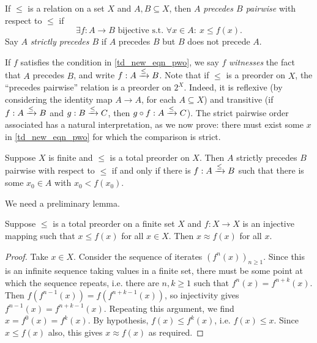 \begin{definition}
    If $\le$ is a relation on a set $X$ and $A, B \subseteq X$, then $A$
    \emph{precedes $B$ pairwise} with respect to $\le$ if
    \begin{equation}
        \label{td_new_eqn_pwo}
        \exists f: A \to B \text{ bijective s.t. }
        \forall x \in A:\ x \le f(x).
    \end{equation}
    Say $A$ \emph{strictly precedes $B$} if $A$ precedes $B$ but $B$ does not
    precede $A$.
\end{definition}

If $f$ satisfies the condition in \cref{td_new_eqn_pwo}, we say $f$
\emph{witnesses} the fact that $A$ precedes $B$, and write
${f}:{A} \xrightarrow{\le} {B}$.  Note that if $\le$ is a preorder on $X$, the
``precedes pairwise'' relation is a preorder on $2^X$.  Indeed, it is reflexive
(by considering the identity map $A \to A$, for each $A \subseteq X$) and
transitive (if ${f}:{A} \xrightarrow{\le} {B}$ and ${g}:{B} \xrightarrow{\le} {C}$, then
${g \circ f}:{A} \xrightarrow{\le} {C}$). The strict pairwise order associated has a
natural interpretation, as we now prove: there must exist some $x$ in
\cref{td_new_eqn_pwo} for which the comparison is strict.

\begin{proposition}
    \label{td_new_prop_pwo_strict_part}
    Suppose $X$ is finite and $\le$ is a total preorder on $X$. Then $A$
    strictly precedes $B$ pairwise with respect to $\le$ if and only if there
    is ${f}:{A} \xrightarrow{\le} {B}$ such that there is some $x_0 \in A$ with $x_0 <
    f(x_0)$.
\end{proposition}

We need a  preliminary lemma.

\begin{lemma}
    \label{td_new_lemma_pwo_strict_helper}
    Suppose $\le$ is a total preorder on a finite set $X$ and $f: X \to X$ is
    an injective mapping such that $x \le f(x)$ for all $x \in X$. Then $x
    \approx f(x)$ for all $x$.
\end{lemma}

\begin{proof}
    Take $x \in X$. Consider the sequence of iterates $(f^n(x))_{n \ge 1}$.
    Since this is an infinite sequence taking values in a finite set, there
    must be some point at which the sequence repeats, i.e. there are $n, k \ge
    1$ such that $f^n(x) = f^{n + k}(x)$. Then $f(f^{n - 1}(x)) = f(f^{n + k -
    1}(x))$, so injectivity gives $f^{n - 1}(x) = f^{n + k - 1}(x)$. Repeating
    this argument, we find $x = f^0(x) = f^k(x)$. By hypothesis, $f(x) \le
    f^k(x)$, i.e. $f(x) \le x$. Since $x \le f(x)$ also, this gives $x \approx
    f(x)$ as required.
\end{proof}

